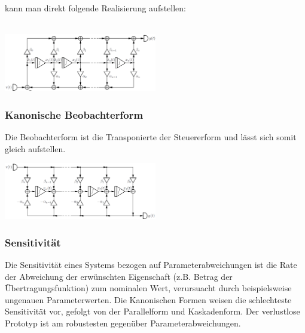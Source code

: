 \documentclass[a4paper,landscape,6pt]{article}
\begin{document}
\begin{multicols}{3}
kann man direkt folgende Realisierung aufstellen:\\\\
\begin{minipage}[t]{0.6\textwidth}
	\includegraphics[width=0.5\textwidth]{images_ssp/Steuererform}\\
\end{minipage}

\subsubsection*{Kanonische Beobachterform}
Die Beobachterform ist die Transponierte der Steuererform und lässt sich somit gleich aufstellen.

\begin{minipage}[t]{0.6\textwidth}
	\includegraphics[width=0.5\textwidth]{images_ssp/Beobachterform}\\
\end{minipage}


\subsubsection*{Sensitivität}
Die Sensitivität eines Systems bezogen auf Parameterabweichungen ist die Rate der Abweichung der erwünschten Eigenschaft (z.B. Betrag der Übertragungsfunktion) zum nominalen Wert, verursuacht durch beispielsweise ungenauen Parameterwerten. Die Kanonischen Formen weisen die schlechteste Sensitivität vor, gefolgt von der Parallelform und Kaskadenform. Der verlustlose Prototyp ist am robustesten gegenüber Parameterabweichungen.


\end{multicols}
\end{document}
